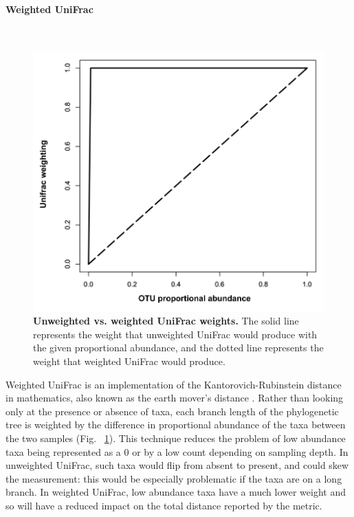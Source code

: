 \FloatBarrier

\paragraph{Weighted UniFrac}\mbox{}\\

\begin{figure}[h]
\includegraphics[scale=0.5]{weights.png}
\caption[Unweighted vs. weighted UniFrac weights.]{{\bf Unweighted vs. weighted UniFrac weights.}
The solid line represents the weight that unweighted UniFrac would produce with the given proportional abundance, and the dotted line represents the weight that weighted UniFrac would produce.}
\label{figure_weights}
\end{figure}

Weighted UniFrac is an implementation of the Kantorovich-Rubinstein distance in mathematics, also known as the earth mover's distance \cite{evans2012phylogenetic}. Rather than looking only at the presence or absence of taxa, each branch length of the phylogenetic tree is weighted by the difference in proportional abundance of the taxa between the two samples (Fig. ~\ref{figure_weights}). This technique reduces the problem of low abundance taxa being represented as a 0 or by a low count depending on sampling depth. In unweighted UniFrac, such taxa would flip from absent to present, and could skew the measurement: this would be especially problematic if the taxa are on a long branch. In weighted UniFrac, low abundance taxa have a much lower weight and so will have a reduced impact on the total distance reported by the metric.

